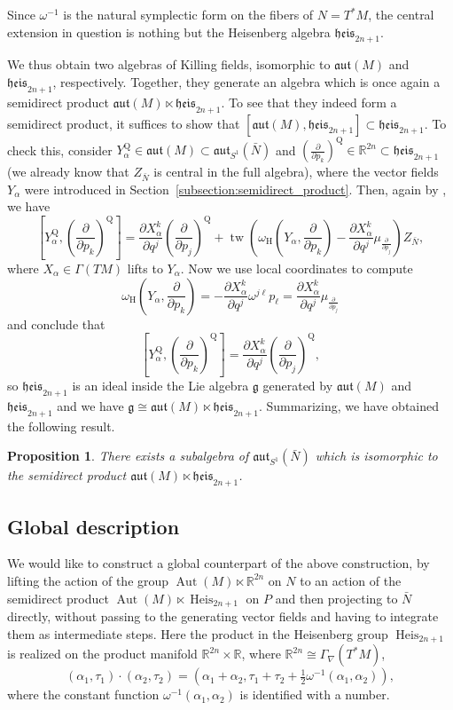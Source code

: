 \documentclass{article}
\newtheorem{proposition}[theorem]{Proposition}
\theoremstyle{definition}
\DeclareMathOperator{\Aut}{Aut}
\DeclareMathOperator{\Heis}{Heis}
\newcommand{\R}{\mathbb{R}}
\newcommand{\frg}{\mathfrak{g}}
\newcommand{\hor}{\mathrm{H}}
\newcommand{\rmQ}{\mathrm{Q}}
\newcommand{\aut}{\mathfrak{aut}}
\newcommand{\heis}{\mathfrak{heis}}
\newcommand{\pd}[2]{\frac{\partial #1}{\partial #2}}
\begin{document}
	Since $\omega^{-1}$ is the natural symplectic form on the fibers of $N=T^*M$, the central extension in question is nothing but the Heisenberg algebra $\heis_{2n+1}$.\medskip
	
	We thus obtain two algebras of Killing fields, isomorphic to $\aut(M)$ and $\heis_{2n+1}$, respectively. Together, they generate an algebra which is once again a semidirect product $\aut(M)\ltimes\heis_{2n+1}$. To see that they indeed form a semidirect product, it suffices to show that $[\aut(M),\heis_{2n+1}]\subset\heis_{2n+1}$. To check this, consider $Y_\alpha^{\rmQ}\in\aut(M)\subset\mathfrak{aut}_{S^1}(\bar{N})$ and $(\pd{}{p_k})^{\rmQ}\in\R^{2n}\subset\heis_{2n+1}$ (we already know that $Z_{\bar{N}}$ is central in the full algebra), where the vector fields $Y_\alpha$ were introduced in Section~\ref{subsection:semidirect_product}. Then, again by \cite[Theorem~3.8]{CST21}, we have $$\left[Y_\alpha^\rmQ,\left(\pd{}{p_k}\right)^{\rmQ}\right]=\pd{X_\alpha^k}{q^j}\left(\pd{}{p_j}\right)^\rmQ+\operatorname{tw}\left(\omega_\hor\left(Y_\alpha,\pd{}{p_k}\right)-\pd{X_\alpha^k}{q^j}\mu_{\pd{}{p_j}}\right)Z_{\bar{N}},$$ where $X_\alpha\in\Gamma(TM)$ lifts to $Y_\alpha$. Now we use local coordinates to compute $$\omega_\hor\left(Y_\alpha,\pd{}{p_k}\right)=-\pd{X_\alpha^k}{q^j}\omega^{j\ell}p_\ell=\pd{X_\alpha^k}{q^j}\mu_{\pd{}{p_j}}$$ and conclude that $$\left[Y_\alpha^\rmQ,\left(\pd{}{p_k}\right)^{\rmQ}\right]=\pd{X_\alpha^k}{q^j}\left(\pd{}{p_j}\right)^\rmQ,$$ so $\heis_{2n+1}$ is an ideal inside the Lie algebra $\frg$ generated by $\aut(M)$ and $\heis_{2n+1}$ and we have $\frg\cong\aut(M)\ltimes\heis_{2n+1}$. Summarizing, we have obtained the following result.
 
    \begin{proposition}
        There exists a subalgebra of $\aut_{S^1}(\bar{N})$ which is isomorphic to the semidirect product $\aut(M)\ltimes\heis_{2n+1}$.
    \end{proposition}
 
    \subsection{Global description}
 
    We would like to construct a global counterpart of the above construction, by lifting the action of the group $\Aut(M)\ltimes\R^{2n}$ on $N$ to an action of the semidirect product $\Aut(M)\ltimes\Heis_{2n+1}$ on $P$ and then projecting to $\bar{N}$ directly, without passing to the generating vector fields and having to integrate them as intermediate steps. Here the product in the Heisenberg group $\Heis_{2n+1}$ is realized on the product manifold $\R^{2n}\times \R$, where $\R^{2n}\cong\Gamma_\nabla(T^*M)$, $$(\alpha_1 , \tau_1 )\cdot (\alpha_2 , \tau_2 ) = (\alpha_1 + \alpha_2 ,\tau_1+\tau_2 + \tfrac12 \omega^{-1}(\alpha_1, \alpha_2 )),$$ where the constant function $\omega^{-1}(\alpha_1, \alpha_2 )$ is identified with a number.\medskip
    
\end{document}
